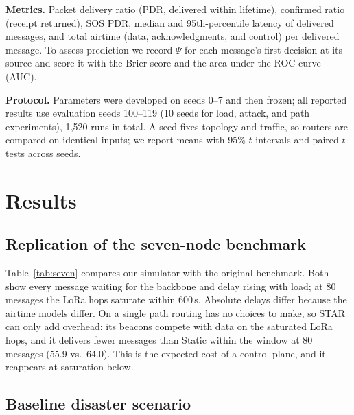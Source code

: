 \documentclass[jou,a4paper,11pt,floatsintext]{apa7}
\begin{document}
\textbf{Metrics.} Packet delivery ratio (PDR, delivered within lifetime), confirmed ratio (receipt returned), SOS PDR, median and 95th-percentile latency of delivered messages, and total airtime (data, acknowledgments, and control) per delivered message. To assess prediction we record $\Psi$ for each message's first decision at its source and score it with the Brier score \parencite{brier1950,gneiting2007} and the area under the ROC curve (AUC).

\textbf{Protocol.} Parameters were developed on seeds 0--7 and then frozen; all reported results use evaluation seeds 100--119 (10 seeds for load, attack, and path experiments), 1{,}520 runs in total. A seed fixes topology and traffic, so routers are compared on identical inputs; we report means with 95\% $t$-intervals and paired $t$-tests across seeds.

\section{Results}
\label{sec:results}

\subsection{Replication of the seven-node benchmark}



Table~\ref{tab:seven} compares our simulator with the original benchmark. Both show every message waiting for the backbone and delay rising with load; at 80 messages the LoRa hops saturate within 600\,s. Absolute delays differ because the airtime models differ. On a single path routing has no choices to make, so STAR can only add overhead: its beacons compete with data on the saturated LoRa hops, and it delivers fewer messages than Static within the window at 80 messages (55.9 vs.\ 64.0). This is the expected cost of a control plane, and it reappears at saturation below.

\subsection{Baseline disaster scenario}


\end{document}
